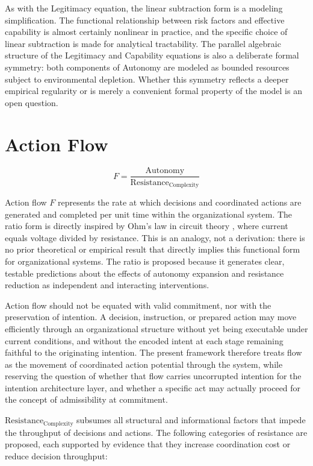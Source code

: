 \documentclass[12pt]{article}
\begin{document}
As with the Legitimacy equation, the linear subtraction form is a modeling
simplification. The functional relationship between risk factors and
effective capability is almost certainly nonlinear in practice, and the
specific choice of linear subtraction is made for analytical tractability.
The parallel algebraic structure of the Legitimacy and Capability equations
is also a deliberate formal symmetry: both components of Autonomy are
modeled as bounded resources subject to environmental depletion. Whether
this symmetry reflects a deeper empirical regularity or is merely a
convenient formal property of the model is an open question.

\section{Action Flow}
\label{sec:flow}

\[
F = \frac{\text{Autonomy}}{\text{Resistance}_{\text{Complexity}}}
\]

Action flow $F$ represents the rate at which decisions and coordinated actions
are generated and completed per unit time within the organizational system.
The ratio form is directly inspired by Ohm's law in circuit theory
\citep{feynman1963lectures}, where current equals voltage divided by resistance.
This is an analogy, not a derivation: there is no prior theoretical or empirical
result that directly implies this functional form for organizational systems.
The ratio is proposed because it generates clear, testable predictions about
the effects of autonomy expansion and resistance reduction as independent
and interacting interventions.

Action flow should not be equated with valid commitment, nor with the
preservation of intention. A decision, instruction, or prepared action may
move efficiently through an organizational structure without yet being
executable under current conditions, and without the encoded intent at each
stage remaining faithful to the originating intention. The present framework
therefore treats flow as the movement of coordinated action potential through
the system, while reserving the question of whether that flow carries
uncorrupted intention for the intention architecture layer, and whether a
specific act may actually proceed for the concept of admissibility at
commitment.

$\text{Resistance}_{\text{Complexity}}$ subsumes all structural and
informational factors that impede the throughput of decisions and actions.
The following categories of resistance are proposed, each supported by
evidence that they increase coordination cost or reduce decision throughput:
\end{document}
